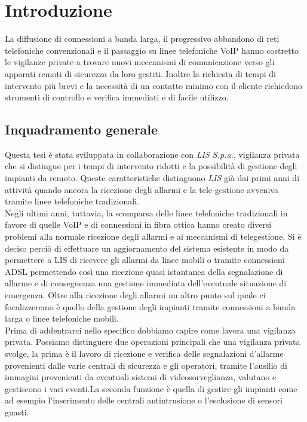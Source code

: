 \chapter{Introduzione}
\label{Introduzione}
\thispagestyle{empty}


\noindent La diffusione di connessioni a banda larga, il progressivo abbandono di reti telefoniche convenzionali e il passaggio su linee telefoniche VoIP hanno costretto le vigilanze private a trovare nuovi meccanismi di comunicazione verso gli apparati remoti di sicurezza da loro gestiti. Inoltre la richiesta di tempi di intervento più brevi e la necessità di un contatto minimo con il cliente richiedono strumenti di controllo e verifica immediati e di facile utilizzo.

\section{Inquadramento generale}
Questa tesi è stata sviluppata in collaborazione con \emph{LIS S.p.a.}, vigilanza privata che si distingue per i tempi di intervento ridotti e la possibilità di gestione degli impianti da remoto. Queste caratteristiche distinguono \emph{LIS} già dai primi anni di attività quando ancora la ricezione degli allarmi e la tele-gestione avveniva tramite linee telefoniche tradizionali.\\
Negli ultimi anni, tuttavia, la scomparsa delle linee telefoniche tradizionali in favore di quelle VoIP e di connessioni in fibra ottica hanno creato diversi problemi alla normale ricezione degli allarmi e ai meccanismi di telegestione. Si è deciso perciò di effettuare un aggiornamento del sistema esistente in modo da permettere a LIS di ricevere gli allarmi da linee mobili o tramite connessioni ADSL permettendo così una ricezione quasi istantanea della segnalazione di allarme e di conseguenza una gestione immediata dell'eventuale situazione di emergenza. Oltre alla ricezione degli allarmi un altro punto sul quale ci focalizzeremo è quello della gestione degli impianti tramite connessioni a banda larga o linee telefoniche mobili.\\
Prima di addentrarci nello specifico dobbiamo capire come lavora una vigilanza privata. Possiamo distinguere due operazioni principali che una vigilanza privata svolge, la prima è il lavoro di ricezione e verifica delle segnalazioni d'allarme provenienti dalle varie centrali di sicurezza e gli operatori, tramite l'ausilio di immagini provenienti da eventuali sistemi di videosorveglianza, valutano e gestiscono i vari eventi.La seconda funzione è quella di gestire gli impianti come ad esempio l'inserimento delle centrali antintrusione o l'esclusione di sensori guasti.\\
